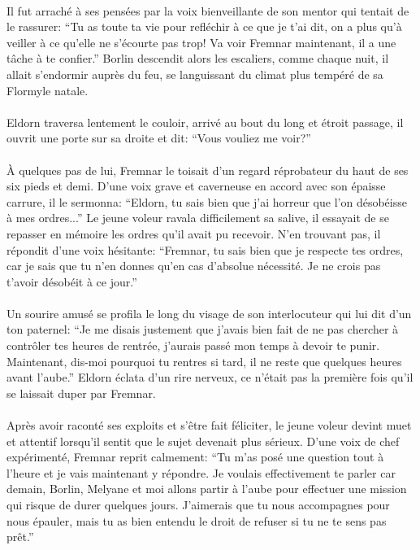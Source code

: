 \paragraph{}
Il fut arraché à ses pensées par la voix bienveillante de son mentor qui
tentait de le rassurer: ``Tu as toute ta vie pour refléchir à ce que je t'ai
dit, on a plus qu'à veiller à ce qu'elle ne s'écourte pas trop! Va voir
Fremnar maintenant, il a une tâche à te confier.'' Borlin descendit alors les
escaliers, comme chaque nuit, il allait s'endormir auprès du feu, se
languissant du climat plus tempéré de sa Flormyle natale.

\paragraph{}
Eldorn traversa lentement le couloir, arrivé au bout du long et étroit
passage, il ouvrit une porte sur sa droite et dit: ``Vous vouliez me voir?''

\paragraph{}
À quelques pas de lui, Fremnar le toisait d'un regard réprobateur du haut de
ses six pieds et demi. D'une voix grave et caverneuse en accord avec son
épaisse carrure, il le sermonna: ``Eldorn, tu sais bien que j'ai horreur que
l'on désobéisse à mes ordres...'' Le jeune voleur ravala difficilement sa
salive, il essayait de se repasser en mémoire les ordres qu'il avait pu
recevoir. N'en trouvant pas, il répondit d'une voix hésitante: ``Fremnar, tu
sais bien que je respecte tes ordres, car je sais que tu n'en donnes qu'en cas
d'absolue nécessité. Je ne crois pas t'avoir désobéit à ce jour.''

\paragraph{}
Un sourire amusé se profila le long du visage de son interlocuteur qui lui dit
d'un ton paternel: ``Je me disais justement que j'avais bien fait de ne pas
chercher à contrôler tes heures de rentrée, j'aurais passé mon temps à devoir
te punir. Maintenant, dis-moi pourquoi tu rentres si tard, il ne reste que
quelques heures avant l'aube.'' Eldorn éclata d'un rire nerveux, ce n'était
pas la première fois qu'il se laissait duper par Fremnar.

\paragraph{}
Après avoir raconté ses exploits et s'être fait féliciter, le jeune voleur
devint muet et attentif lorsqu'il sentit que le sujet devenait plus sérieux.
D'une voix de chef expérimenté, Fremnar reprit calmement: ``Tu m'as posé une
question tout à l'heure et je vais maintenant y répondre. Je voulais
effectivement te parler car demain, Borlin, Melyane et moi allons partir à
l'aube pour effectuer une mission qui risque de durer quelques jours.
J'aimerais que tu nous accompagnes pour nous épauler, mais tu as bien entendu
le droit de refuser si tu ne te sens pas prêt.''

